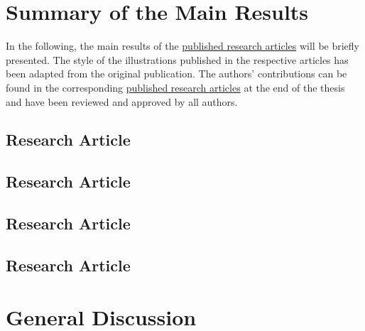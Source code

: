 \documentclass[oneside]{book}
\newcommand{\uproman}[1]{\MakeUppercase{\romannumeral#1}}
\begin{document}
    \chapter{Summary of the Main Results}
    \label{chap:results}
    In the following, the main results of the \hyperref[pub:papers]{published research articles} will be briefly presented. The style of the illustrations published in the respective articles has been adapted from the original publication. The authors' contributions can be found in the corresponding \hyperref[pub:papers]{published research articles} at the end of the thesis and have been reviewed and approved by all authors.
    
        \section{Research Article \uproman{1}}
        \label{results:paperI}
        
        
        \section{Research Article \uproman{2}}
        \label{results:paperII}
        
        
        \newpage
        \section{Research Article \uproman{3}}
        \label{results:paperIII}
        
        
        \section{Research Article \uproman{4}}
        \label{results:paperIV}
        

    \chapter{General Discussion}
    \label{chap:discussion}
    

    \printbibliography[heading=bibintoc,title={References}]

    \chapter*{\vspace*{\fill}\vspace*{\fill}}
    \label{pub:papers}
        \newpage
\end{document}
